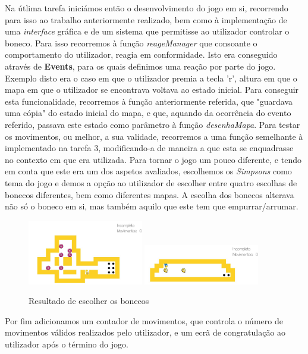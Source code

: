 \documentclass[a4paper]{article}
\begin{document}
Na útlima tarefa iniciámos então o desenvolvimento do jogo em si, recorrendo para isso ao trabalho anteriormente realizado, bem como à implementação de uma \textit{interface} gráfica e de um sistema que permitisse ao utilizador controlar o boneco. Para isso recorremos à função \emph{reageManager} que consoante o comportamento do utilizador, reagia em conformidade. Isto era conseguido através de \textbf{Events}, para os quais definimos uma reação por parte do jogo. Exemplo disto era o caso em que o utilizador premia a tecla 'r', altura em que o mapa em que o utilizador se encontrava voltava ao estado inicial. Para conseguir esta funcionalidade, recorremos à função anteriormente referida, que "guardava uma cópia" do estado inicial do mapa, e que, aquando da ocorrência do evento referido, passava este estado como parâmetro à função \emph{desenhaMapa}. Para testar os movimentos, ou melhor, a sua validade, recorremos a uma função semelhante à implementado na tarefa 3, modificando-a de maneira a que esta se enquadrasse no contexto em que era utilizada. 
Para tornar o jogo um pouco diferente, e tendo em conta que este era um dos aspetos avaliados, escolhemos os \emph{Simpsons} como tema do jogo e demos a opção ao utilizador de escolher entre quatro escolhas de bonecos diferentes, bem como diferentes mapas. A escolha dos bonecos alterava não só o boneco em si, mas também aquilo que este tem que empurrar/arrumar. 

\begin{figure}[ht]
	\centering
	\includegraphics[width=0.45\textwidth]{Recursos/escolha1.jpg}
	\includegraphics[width=0.45\textwidth]{Recursos/escolha2.jpg}  
	\caption{Resultado de escolher os bonecos}
\end{figure}

Por fim adicionamos um contador de movimentos, que controla o número de movimentos válidos realizados pelo utilizador, e um ecrã de congratulação ao utilizador após o término do jogo.
\end{document}
